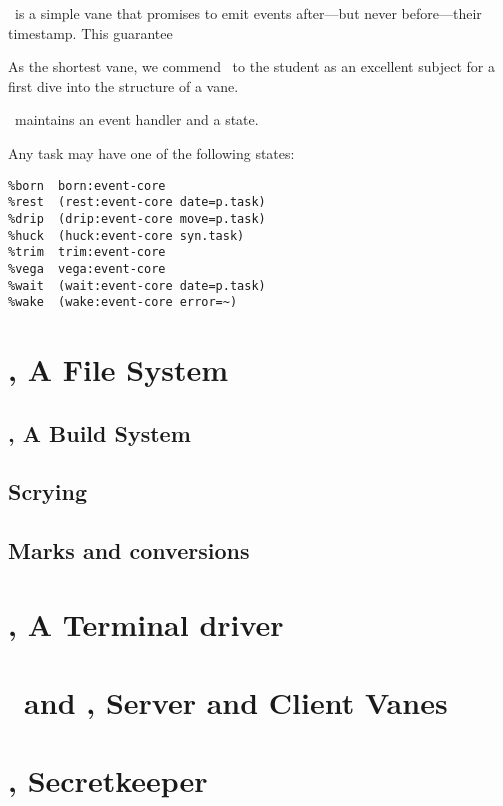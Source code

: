 \behn~is a simple vane that promises to emit events after—but never before—their timestamp.  This guarantee

As the shortest vane, we commend \behn~to the student as an excellent subject for a first dive into the structure of a vane.

\behn~maintains an event handler and a state.

Any task may have one of the following states:

\begin{lstlisting}
%born  born:event-core
%rest  (rest:event-core date=p.task)
%drip  (drip:event-core move=p.task)
%huck  (huck:event-core syn.task)
%trim  trim:event-core
%vega  vega:event-core
%wait  (wait:event-core date=p.task)
%wake  (wake:event-core error=~)
\end{lstlisting}


\section[\clay]{\clay, A File System}

\subsection[\ford]{\ford, A Build System}

\subsection{Scrying}

\subsection[Marks]{Marks and conversions}

\section[\dill]{\dill, A Terminal driver}

\section[\eyre~\&~\iris]{\eyre~and \iris, Server and Client Vanes}

\section[\jael]{\jael, Secretkeeper}

